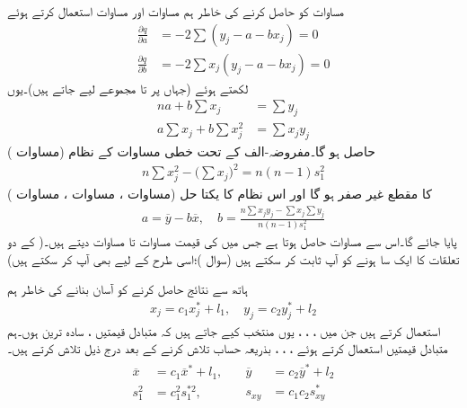مساوات  کو حاصل کرنے کی خاطر ہم مساوات  اور مساوات  استعمال کرتے ہوئے 
\begin{align*}
\frac{\partial q}{\partial a}&=-2\sum(y_j-a-bx_j)=0\\
\frac{\partial q}{\partial b}&=-2\sum x_j(y_j-a-bx_j)=0
\end{align*}
لکھتے ہوئے (جہاں  پر  تا  مجموعے لیے جاتے ہیں)۔یوں
\begin{align*}
na+b\sum x_j&=\sum y_j\\
a\sum x_j+b\sum x_j^2&=\sum x_jy_j
\end{align*}
حاصل ہو گا۔مفروضہ-الف کے تحت خطی مساوات کے نظام (مساوات )
\begin{align*}
n\sum x_j^2-\big(\sum x_j\big)^2=n(n-1)s_1^2
\end{align*}
کا مقطع غیر صفر ہو گا اور اس نظام کا یکتا حل (مساوات ، مساوات ، مساوات )
\begin{align}
a=\overline{y}-b\overline{x},\quad b=\frac{n\sum x_jy_j-\sum x_j\sum y_j}{n(n-1)s_1^2}
\end{align}
 پایا جائے گا۔اس سے مساوات  حاصل ہوتا ہے جس میں  کی قیمت مساوات  تا مساوات  دیتے ہیں۔( کے دو تعلقات کا ایک سا ہونے کو آپ ثابت کر سکتے ہیں (سوال )؛اسی طرح  کے لیے بھی آپ کر سکتے ہیں)

ہاتھ سے نتائج حاصل کرنے کو آسان بنانے کی خاطر ہم 
\begin{align}
x_j=c_1x_j^*+l_1,\quad y_j=c_2y_j^*+l_2
\end{align}
استعمال کرتے ہیں جن میں ، ، ،  یوں منتخب کیے جاتے ہیں کہ متبادل قیمتیں ،  سادہ ترین ہوں۔ہم متبادل قیمتیں استعمال کرتے ہوئے  ، ، ،  بذریعہ حساب تلاش کرنے کے بعد درج ذیل تلاش کرتے ہیں۔
\begin{gather}
\begin{aligned}
\overline{x}&=c_1\overline{x}^*+l_1,\\
s_1^2&=c_1^2s_1^{*2},
\end{aligned}
\quad 
\begin{aligned}
\overline{y}&=c_2\overline{y}^*+l_2\\
s_{xy}&=c_1c_2s_{xy}^*
\end{aligned}
\end{gather}

